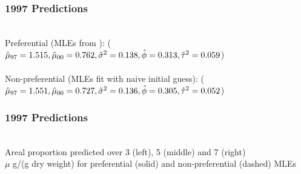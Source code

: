 \documentclass[xcolor=svgnames]{beamer}
\begin{document}
\begin{frame}
\frametitle{1997 Predictions}
\begin{center}
\\
\vspace{-.05in} {\tiny Preferential (MLEs from \citep{diggle2010}): ($\hat{\mu}_{97} = 1.515, \hat{\mu}_{00} = 0.762, \hat{\sigma}^2=0.138, \hat{\phi}=0.313, \hat{\tau}^2=0.059$)}
\\
\\
\vspace{-.05in} {\tiny Non-preferential (MLEs fit with naive initial guess): ($\hat{\mu}_{97} = 1.551, \hat{\mu}_{00} = 0.727, \hat{\sigma}^2=0.136, \hat{\phi}=0.305, \hat{\tau}^2=0.052$)}
\end{center}
\end{frame}
\begin{frame}
\frametitle{1997 Predictions}
\begin{center}
\\
{Areal proportion predicted over 3 (left), 5 (middle) and 7 (right) \\ $\mu$ g/(g dry weight) for preferential (solid) and non-preferential (dashed) MLEs}
\end{center}
\end{frame}
\end{document}
